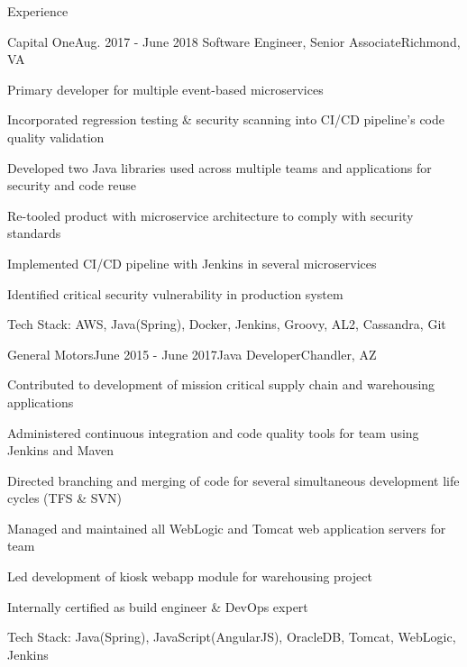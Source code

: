 \documentclass{resume} %
\begin{document}
\begin{rSection}{\vspace{-1em}Experience}
	\begin{rSubsection}{Capital One}{Aug. 2017 - June 2018}
			{Software Engineer, Senior Associate}{Richmond, VA}
		\item Primary developer for multiple event-based microservices
		\item Incorporated regression testing \& security scanning into CI/CD pipeline's code quality validation
		\item Developed two Java libraries used across multiple teams and applications for security and code reuse
		\item Re-tooled product with microservice architecture to comply with security standards
		\item Implemented CI/CD pipeline with Jenkins in several microservices
		\item Identified critical security vulnerability in production system
		\item Tech Stack: AWS, Java(Spring), Docker, Jenkins, Groovy, AL2, Cassandra, Git
	\end{rSubsection}\vspace{-0.5em}

	\begin{rSubsection}{General Motors}{June 2015 - June 2017}{Java Developer}{Chandler, AZ}
		\item Contributed to development of mission critical supply chain and warehousing applications
		\item Administered continuous integration and code quality tools for team using Jenkins and Maven
		\item Directed branching and merging of code for several simultaneous development life cycles (TFS \& SVN)
		\item Managed and maintained all WebLogic and Tomcat web application servers for team
		\item Led development of kiosk webapp module for warehousing project
		\item Internally certified as build engineer \& DevOps expert
		\item Tech Stack: Java(Spring), JavaScript(AngularJS), OracleDB, Tomcat, WebLogic, Jenkins
	\end{rSubsection}\vspace{-0.5em}



\end{rSection}
\end{document}
